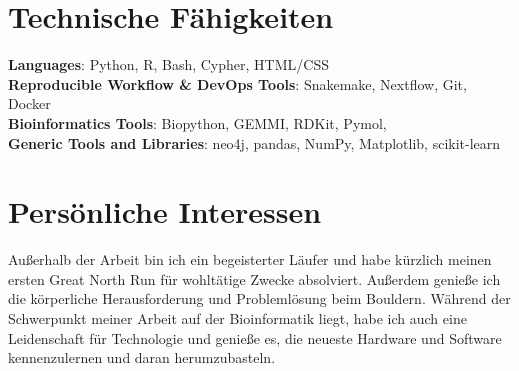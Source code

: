 \documentclass[a4paper,11pt]{article}
\begin{document}
\section{Technische Fähigkeiten}
 \begin{itemize}[leftmargin=0.15in, label={}]
    \small{\item{
     \textbf{Languages}{: Python, R, Bash, Cypher, HTML/CSS} \\
     \textbf{Reproducible Workflow \& DevOps Tools}{: Snakemake, Nextflow, Git, Docker} \\
     \textbf{Bioinformatics Tools}{: Biopython, GEMMI, RDKit, Pymol, } \\
     \textbf{Generic Tools and Libraries}{: neo4j, pandas, NumPy, Matplotlib, scikit-learn}
     
    }}
 \end{itemize}


%
\section{Persönliche Interessen}
\begin{flushleft}
Außerhalb der Arbeit bin ich ein begeisterter Läufer und habe kürzlich meinen ersten Great North Run für wohltätige Zwecke absolviert. Außerdem genieße ich die körperliche Herausforderung und Problemlösung beim Bouldern. Während der Schwerpunkt meiner Arbeit auf der Bioinformatik liegt, habe ich auch eine Leidenschaft für Technologie und genieße es, die neueste Hardware und Software kennenzulernen und daran herumzubasteln.
\end{flushleft}

\end{document}
